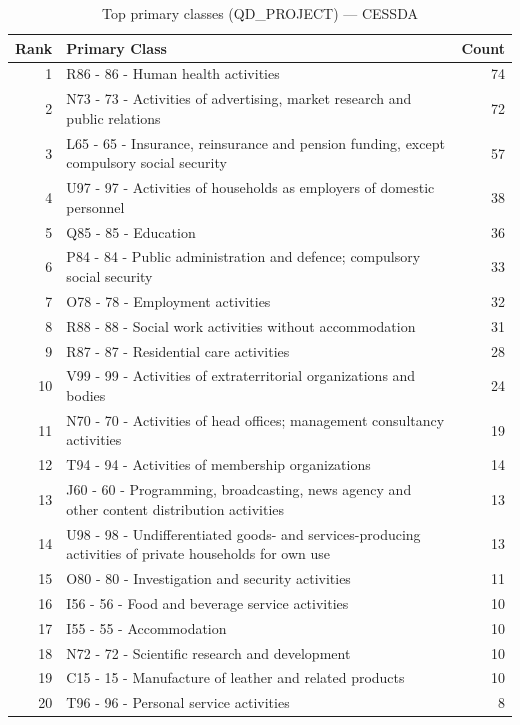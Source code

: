 \begin{table}[H]
    \centering
    \begin{tabular}{r p{10cm} r}
    \hline
    \textbf{Rank} & \textbf{Primary Class} & \textbf{Count} \\
    \hline
    1 & R86 - 86 - Human health activities & 74 \\
    2 & N73 - 73 - Activities of advertising, market research and public relations & 72 \\
    3 & L65 - 65 - Insurance, reinsurance and pension funding, except compulsory social security & 57 \\
    4 & U97 - 97 - Activities of households as employers of domestic personnel & 38 \\
    5 & Q85 - 85 - Education & 36 \\
    6 & P84 - 84 - Public administration and defence; compulsory social security & 33 \\
    7 & O78 - 78 - Employment activities & 32 \\
    8 & R88 - 88 - Social work activities without accommodation & 31 \\
    9 & R87 - 87 - Residential care activities & 28 \\
    10 & V99 - 99 - Activities of extraterritorial organizations and bodies & 24 \\
    11 & N70 - 70 - Activities of head offices; management consultancy activities & 19 \\
    12 & T94 - 94 - Activities of membership organizations & 14 \\
    13 & J60 - 60 - Programming, broadcasting, news agency and other content distribution activities & 13 \\
    14 & U98 - 98 - Undifferentiated goods- and services-producing activities of private households for own use & 13 \\
    15 & O80 - 80 - Investigation and security activities & 11 \\
    16 & I56 - 56 - Food and beverage service activities & 10 \\
    17 & I55 - 55 - Accommodation & 10 \\
    18 & N72 - 72 - Scientific research and development & 10 \\
    19 & C15 - 15 - Manufacture of leather and related products & 10 \\
    20 & T96 - 96 - Personal service activities & 8 \\
    \hline
    \end{tabular}
    \caption{Top primary classes (QD\_PROJECT) --- CESSDA}
\end{table}


